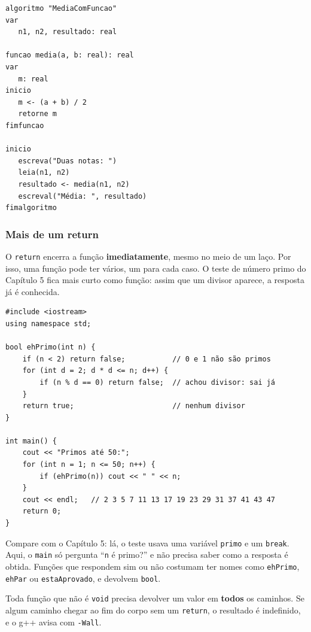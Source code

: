 \begin{codigo}
\begin{Verbatim}[breaklines=true, breaksymbolleft={}, fontsize=\footnotesize]
algoritmo "MediaComFuncao"
var
   n1, n2, resultado: real

funcao media(a, b: real): real
var
   m: real
inicio
   m <- (a + b) / 2
   retorne m
fimfuncao

inicio
   escreva("Duas notas: ")
   leia(n1, n2)
   resultado <- media(n1, n2)
   escreval("Média: ", resultado)
fimalgoritmo
\end{Verbatim}
\end{codigo}

\subsubsection{Mais de um return}

O \texttt{return} encerra a função \textbf{imediatamente}, mesmo no meio de um laço. Por isso, uma função pode ter vários, um para cada caso. O teste de número primo do Capítulo 5 fica mais curto como função: assim que um divisor aparece, a resposta já é conhecida.

\begin{codigo}
\begin{Verbatim}[breaklines=true, breaksymbolleft={}, fontsize=\footnotesize]
#include <iostream>
using namespace std;

bool ehPrimo(int n) {
    if (n < 2) return false;           // 0 e 1 não são primos
    for (int d = 2; d * d <= n; d++) {
        if (n % d == 0) return false;  // achou divisor: sai já
    }
    return true;                       // nenhum divisor
}

int main() {
    cout << "Primos até 50:";
    for (int n = 1; n <= 50; n++) {
        if (ehPrimo(n)) cout << " " << n;
    }
    cout << endl;   // 2 3 5 7 11 13 17 19 23 29 31 37 41 43 47
    return 0;
}
\end{Verbatim}
\end{codigo}

Compare com o Capítulo 5: lá, o teste usava uma variável \texttt{primo} e um \texttt{break}. Aqui, o \texttt{main} só pergunta ``\texttt{n} é primo?'' e não precisa saber como a resposta é obtida. Funções que respondem sim ou não costumam ter nomes como \texttt{ehPrimo}, \texttt{ehPar} ou \texttt{estaAprovado}, e devolvem \texttt{bool}.

Toda função que não é \texttt{void} precisa devolver um valor em \textbf{todos} os caminhos. Se algum caminho chegar ao fim do corpo sem um \texttt{return}, o resultado é indefinido, e o g++ avisa com \texttt{-Wall}.

